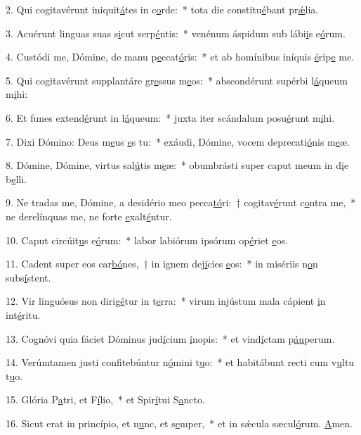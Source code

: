 2. Qui cogitavérunt iniquit\uline{á}tes in c\uline{o}rde:~* tota die constitu\uline{é}bant pr\uline{ǽ}lia.\par 
3. Acuérunt linguas suas s\uline{i}cut serp\uline{é}ntis:~* venénum áspidum sub lábi\uline{i}s e\uline{ó}rum.\par 
4. Custódi me, Dómine, de manu p\uline{e}ccat\uline{ó}ris:~* et ab homínibus iníquis \uline{é}rip\uline{e} me.\par 
5. Qui cogitavérunt supplantáre gr\uline{e}ssus m\uline{e}os:~* abscondérunt supérbi l\uline{á}queum m\uline{i}hi:\par 
6. Et funes extend\uline{é}runt in l\uline{á}queum:~* juxta iter scándalum posu\uline{é}runt m\uline{i}hi.\par 
7. Dixi Dómino: Deus m\uline{e}us \uline{e}s tu:~* exáudi, Dómine, vocem deprecati\uline{ó}nis m\uline{e}æ.\par 
8. Dómine, Dómine, virtus sal\uline{ú}tis m\uline{e}æ:~* obumbrásti super caput meum in d\uline{i}e b\uline{e}lli.\par 
9. Ne tradas me, Dómine, a desidério meo pecca\uline{tó}ri:~† cogitav\uline{é}runt c\uline{o}ntra me,~* ne derelínquas me, ne forte \uline{e}xalt\uline{é}ntur.\par 
10. Caput circúit\uline{u}s e\uline{ó}rum:~* labor labiórum ipsórum op\uline{é}riet \uline{e}os.\par 
11. Cadent super eos car\uline{bó}nes,~† in ignem dej\uline{í}cies \uline{e}os:~* in misériis n\uline{o}n subs\uline{í}stent.\par 
12. Vir linguósus non dirig\uline{é}tur in t\uline{e}rra:~* virum injústum mala cápient \uline{i}n int\uline{é}ritu.\par 
13. Cognóvi quia fáciet Dóminus jud\uline{í}cium \uline{í}nopis:~* et vind\uline{í}ctam p\uline{áu}perum.\par 
14. Verúmtamen justi confitebúntur n\uline{ó}mini t\uline{u}o:~* et habitábunt recti cum v\uline{u}ltu t\uline{u}o.\par 
15. Glória P\uline{a}tri, et F\uline{í}lio,~* et Spir\uline{í}tui S\uline{a}ncto.\par 
16. Sicut erat in princípio, et n\uline{u}nc, et s\uline{e}mper,~* et in sǽcula sæcul\uline{ó}rum. \uline{A}men.\par 
